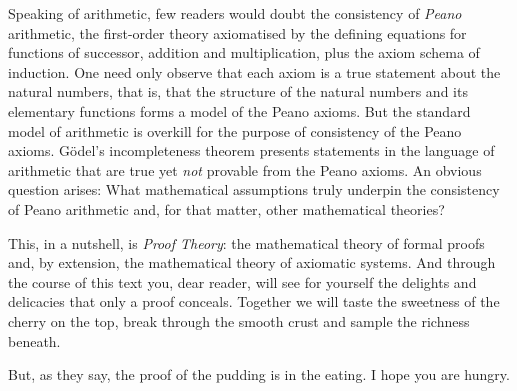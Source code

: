 Speaking of arithmetic, few readers would doubt the consistency of \emph{Peano} arithmetic, the first-order theory axiomatised by the defining equations for functions of successor, addition and multiplication, plus the axiom schema of induction.
One need only observe that each axiom is a true statement about the natural numbers, that is, that the structure of the natural numbers and its elementary functions forms a model of the Peano axioms.
But the standard model of arithmetic is overkill for the purpose of consistency of the Peano axioms.
Gödel's incompleteness theorem presents statements in the language of arithmetic that are true yet \emph{not} provable from the Peano axioms.
An obvious question arises:
What mathematical assumptions truly underpin the consistency of Peano arithmetic and, for that matter, other mathematical theories?

This, in a nutshell, is
\emph{Proof Theory}: the mathematical theory of formal proofs and, by extension, the mathematical theory of axiomatic systems.
%
And through the course of this text you, dear reader, will see  for yourself the delights and delicacies that only a proof conceals.
Together we will taste the sweetness of the cherry on the top, break through the smooth crust and sample the richness beneath.

But, as they say, the proof of the pudding is in the eating.
%
I hope you are hungry.

